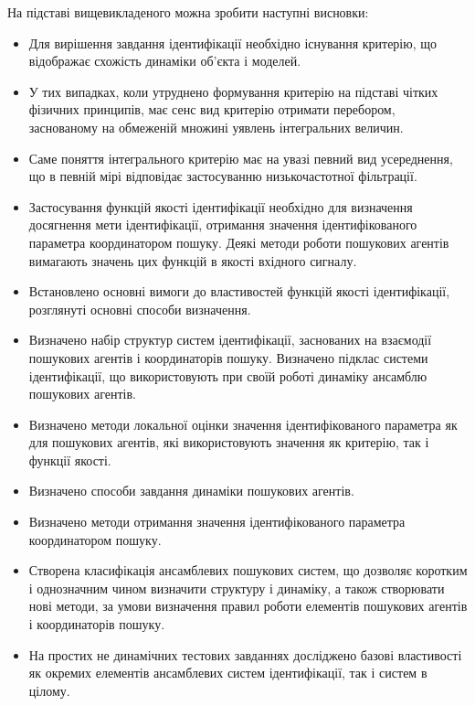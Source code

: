 На підставі вищевикладеного можна зробити наступні висновки:

\begin{itemize}

  \item
    Для вирішення завдання ідентифікації необхідно існування
    критерію, що відображає схожість динаміки об'єкта і моделей.

  \item
    У тих випадках, коли утруднено формування критерію на
    підставі чітких фізичних принципів, має сенс вид критерію
    отримати перебором, заснованому на обмеженій множині уявлень
    інтегральних величин.

  \item
    Саме поняття інтегрального критерію має на увазі певний
    вид усереднення, що в певній мірі відповідає застосуванню
    низькочастотної фільтрації.

  \item
    Застосування функцій якості ідентифікації необхідно для
    визначення досягнення мети ідентифікації, отримання значення
    ідентифікованого параметра координатором пошуку. Деякі методи
    роботи пошукових агентів вимагають значень цих функцій в якості
    вхідного сигналу.

  \item
    Встановлено основні вимоги до властивостей функцій якості
    ідентифікації, розглянуті основні способи визначення.

  \item
    Визначено набір структур систем ідентифікації, заснованих на
    взаємодії пошукових агентів і координаторів пошуку. Визначено
    підклас системи ідентифікації, що використовують при своїй
    роботі динаміку ансамблю пошукових агентів.

  \item
    Визначено методи локальної оцінки значення ідентифікованого
    параметра як для пошукових агентів, які використовують значення
    як критерію, так і функції якості.

  \item
    Визначено способи завдання динаміки пошукових агентів.

  \item
    Визначено методи отримання значення ідентифікованого параметра
    координатором пошуку.

  \item
    Створена класифікація ансамблевих пошукових систем, що дозволяє
    коротким і однозначним чином визначити структуру і динаміку,
    а також створювати нові методи, за умови визначення правил
    роботи елементів пошукових агентів і координаторів пошуку.

  \item
    На простих не динамічних тестових завданнях досліджено базові
    властивості як окремих елементів ансамблевих систем
    ідентифікації, так і систем в цілому.


\end{itemize}

